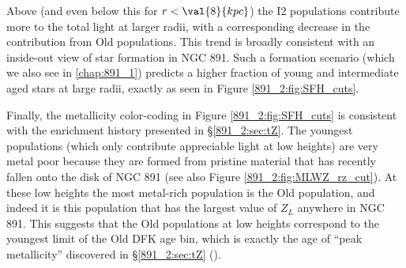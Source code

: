 Above  (and even below this for $r < \val{8}{kpc}$) the
I2 populations contribute more to the total light at larger radii,
with a corresponding decrease in the contribution from Old
populations. This trend is broadly consistent with an inside-out view
of star formation in NGC 891. Such a formation scenario (which we also
see in \ref{chap:891_1}) predicts a higher fraction of young and
intermediate aged stars at large radii, exactly as seen in Figure
\ref{891_2:fig:SFH_cuts}.






Finally, the metallicity color-coding in Figure
\ref{891_2:fig:SFH_cuts} is consistent with the enrichment history
presented in \S\ref{891_2:sec:tZ}. The youngest populations (which
only contribute appreciable light at low heights) are very metal poor
because they are formed from pristine material that has recently
fallen onto the disk of NGC 891 (see also Figure
\ref{891_2:fig:MLWZ_rz_cut}). At these low heights the most metal-rich
population is the Old population, and indeed it is this population
that has the largest value of $Z_L$ anywhere in NGC 891. This suggests
that the Old populations at low heights correspond to the youngest
limit of the Old DFK age bin, which is exactly the age of ``peak
metallicity'' discovered in \S\ref{891_2:sec:tZ} ().

